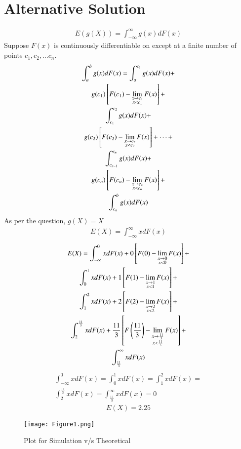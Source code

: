 \documentclass[journal,12pt,twocolumn]{IEEEtran}
\begin{document}
\section*{Alternative Solution}
\begin{align}
    E(g(X)) = \int_{-\infty}^{\infty} g(x)dF(x)
\end{align}
Suppose $F(x)$ is continuously differentiable on  except at a finite number of points $c_1, c_2, \dots c_n$.\\
\begin{multline}
    \int_{a}^{b}g(x)dF(x) = \int_{a}^{c_1}g(x)dF(x) +\\ g(c_1){}\left[F(c_1) - \lim_{\substack{x \to c_1 \\ x < c_1}}F(x)\right] + \\ \int_{c_1}^{c_2}g(x)dF(x) + \\g(c_2){}\left[F(c_2) - \lim_{\substack{x \to c_2 \\ x < c_2}}F(x)\right] + \dots +\\ \int_{c_{n-1}}^{c_n}g(x)dF(x) +\\ g(c_n){}\left[F(c_n) - \lim_{\substack{x \to c_n \\ x < c_n}}F(x)\right] + \\ \int_{c_n}^{b}g(x)dF(x)
\end{multline}
As per the question, $g(X) = X$
\begin{align}
    E(X) = \int_{-\infty}^{\infty} xdF(x)
\end{align}
\begin{multline}
    E(X) = \int_{-\infty}^{0}xdF(x) + 0{}\left[F(0) - \lim_{\substack{x \to 0 \\ x < 0}}F(x)\right] + \\ \int_{0}^{1}xdF(x) + 1{}\left[F(1) - \lim_{\substack{x \to 1 \\ x < 1}}F(x)\right] + \\ \int_{1}^{2}xdF(x) + 2{}\left[F(2) - \lim_{\substack{x \to 2 \\ x < 2}}F(x)\right] + \\ \int_{2}^{\frac{11}{3}}xdF(x) +  \frac{11}{3}{}\left[F\left(\frac{11}{3}\right) - \lim_{\substack{x \to \frac{11}{3} \\ x < \frac{11}{3}}}F(x)\right] +\\ \int_{\frac{11}{3}}^{\infty}xdF(x)
\end{multline}
\begin{multline}
    \int_{-\infty}^{0}xdF(x) = \int_{0}^{1}xdF(x) = \int_{1}^{2}xdF(x) = \\ \int_{2}^{\frac{11}{3}}xdF(x) = \int_{\frac{11}{3}}^{\infty}xdF(x) = 0
\end{multline}
\begin{align}
    E(X) = 2.25
\end{align}
\begin{figure}[hb]
    \centering
    \texttt{[image: Figure1.png]}
    \caption{Plot for Simulation v/s Theoretical}
    \label{fig:plot}
\end{figure}
\end{document}
